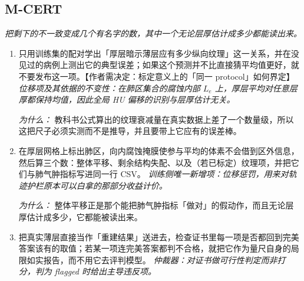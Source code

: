 \documentclass[10pt,a4paper]{article}
\begin{document}
\subsection*{M-CERT}
\emph{把剩下的不一致变成几个有名字的数，其中一个无论层厚估计成多少都能读出来。}
\begin{enumerate}[leftmargin=*,start=3]
  \item 只用训练集的配对学出「厚层暗示薄层应有多少纵向纹理」这一关系，并在没见过的病例上测出它的典型误差；如果这个预测并不比直接猜平均值更好，就不要发布这一项。【作者需决定：标定意义上的「同一 protocol」如何界定】
\noindent\emph{位移项及其依据的不变性：在肺区集合的腐蚀内部 \(L_{e}\) 上，厚层平均对任意层厚都保持均值，因此全局 HU 偏移的识别与层厚估计无关。}
\par{}
\par\emph{为什么：} 教科书公式算出的纹理衰减量在真实数据上差了一个数量级，所以这把尺子必须实测而不是推导，并且要带上它应有的误差棒。
  \item 在厚层网格上标出肺区，向内腐蚀掩膜使参与平均的体素不会借到区外信息，然后算三个数：整体平移、剩余结构失配、以及（若已标定）纹理项，并把它们与肺气肿指标写进同一行 CSV。
\noindent\emph{训练侧唯一新增项：位移惩罚，用来对轨迹护栏原本可以白拿的那部分收益计价。}
\par{}
\par\emph{为什么：} 整体平移正是那个能把肺气肿指标「做对」的假动作，而且无论层厚估计成多少，它都能被读出来。
  \item 把真实薄层直接当作「重建结果」送进去，检查证书里每一项是否都回到完美答案该有的取值；若某一项连完美答案都判不合格，就把它作为量尺自身的局限如实报告，而不用它去评判模型。
\noindent\emph{仲裁器：对证书做可行性判定而非打分，判为 flagged 时给出主导违反项。}

\end{enumerate}
\end{document}
